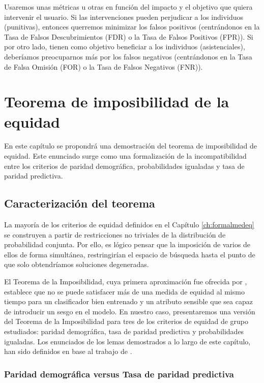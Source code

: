 \documentclass[oneside,openright,titlepage,numbers=noenddot,openany,headinclude,footinclude=true,
cleardoublepage=empty,abstractoff,BCOR=5mm,paper=a4,fontsize=12pt,main=spanish]{scrreprt}
\begin{document}
Usaremos unas métricas u otras en función del impacto y el objetivo que quiera intervenir el usuario. Si las intervenciones pueden perjudicar a los individuos (punitivas), entonces querremos minimizar los falsos positivos (centrándonos en la Tasa de Falsos Descubrimientos (FDR) o la Tasa de Falsos Positivos (FPR)). Si por otro lado, tienen como objetivo beneficiar a los individuos (asistenciales), deberíamos preocuparnos más por los falsos negativos (centrándonos en la Tasa de Falsa Omisión (FOR) o la Tasa de Falsos Negativos (FNR)).

\chapter{Teorema de imposibilidad de la equidad}

\label{ch:teoremaimposibilidad}

En este capítulo se propondrá una demostración del teorema de imposibilidad de equidad. Este enunciado surge como una formalización de la incompatibilidad entre los criterios de paridad demográfica, probabilidades igualadas y tasa de paridad predictiva.

\section{Caracterización del teorema}

La mayoría de los criterios de equidad definidos en el Capítulo \ref{ch:formalmedeq} se construyen a partir de restricciones no triviales de la distribución de probabilidad conjunta. Por ello, es lógico pensar que la imposición de varios de ellos de forma simultánea, restringirían el espacio de búsqueda hasta el punto de que solo obtendríamos soluciones degeneradas.

El Teorema de la Imposibilidad, cuya primera aproximación fue ofrecida por \cite{fairth2016}, establece que no se puede satisfacer más de una medida de equidad al mismo tiempo para un clasificador bien entrenado y un atributo sensible que sea capaz de introducir un sesgo en el modelo. En nuestro caso, presentaremos una versión del Teorema de la Imposibilidad para tres de los criterios de equidad de grupo estudiados: paridad demográfica, tasa de paridad predictiva y probabilidades igualadas. Los enunciados de los lemas demostrados a lo largo de este capítulo, han sido definidos en base al trabajo de \cite{fairnesslearning2019}.


\subsection{Paridad demográfica versus Tasa de paridad predictiva}
\end{document}
